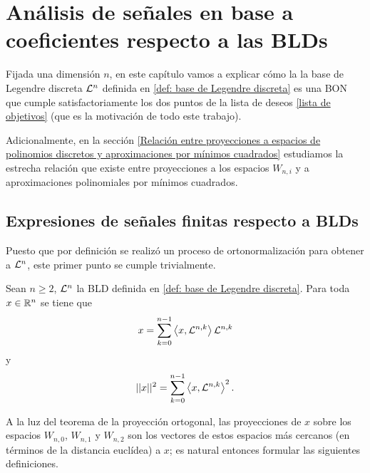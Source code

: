 \chapter{Análisis de señales en base a coeficientes respecto a las BLDs}
\label{chap: Analisis de señales en base a coeficientes respecto a las BLDs}
Fijada una dimensión $n$, 
en este capítulo vamos a explicar cómo la 
la base de Legendre discreta $\mathcal{L}^{n}$ definida en 
\ref{def: base de Legendre discreta}
es una BON que cumple satisfactoriamente los dos puntos de
la lista de deseos
\ref{lista de objetivos}
(que es la motivación de todo este trabajo).



Adicionalmente, en la sección 
\ref{Relación entre proyecciones a espacios de polinomios discretos y aproximaciones por mínimos cuadrados}
estudiamos la estrecha relación que existe entre
proyecciones a los espacios $W_{n,i}$ y a aproximaciones
polinomiales por mínimos cuadrados.


\section{Expresiones de señales finitas respecto a BLDs}


Puesto que por definición se realizó un proceso de ortonormalización
para obtener a $\mathcal{L}^{n}$, este primer punto se cumple trivialmente.

\begin{obs}
Sean $n \geq 2$, $\mathcal{L}^{n}$ la BLD definida en 
\ref{def: base de Legendre discreta}.
Para toda $x \in \mathbb{R}^{n}$ se tiene que 
\[
x = \sum\limits_{k=0}^{n-1}\left\langle x, \mathcal{L}^{n,k} \right\rangle 
\mathcal{L}^{n,k}
\]
y
\[
|| x ||^{2} = \sum\limits_{k=0}^{n-1}\left\langle x, \mathcal{L}^{n,k} \right\rangle^{2}.
\]
\end{obs}

\noindent A la luz del teorema de la proyección ortogonal, 
las proyecciones de $x$ sobre los espacios 
$W_{n,0}$, $W_{n,1}$
y $W_{n,2}$ son los vectores
de estos espacios más cercanos (en términos de la 
distancia euclídea)
a $x$; es natural entonces formular
las siguientes definiciones.



